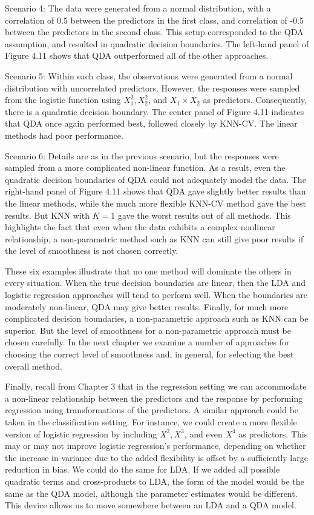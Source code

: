\documentclass[10pt]{article}
\begin{document}
Scenario 4: The data were generated from a normal distribution, with a correlation of 0.5 between the predictors in the first class, and correlation of -0.5 between the predictors in the second class. This setup corresponded to the QDA assumption, and resulted in quadratic decision boundaries. The left-hand panel of Figure 4.11 shows that QDA outperformed all of the other approaches.

Scenario 5: Within each class, the observations were generated from a normal distribution with uncorrelated predictors. However, the responses were sampled from the logistic function using $X_{1}^{2}, X_{2}^{2}$, and $X_{1} \times X_{2}$ as predictors. Consequently, there is a quadratic decision boundary. The center panel of Figure 4.11 indicates that QDA once again performed best, followed closely by KNN-CV. The linear methods had poor performance.

Scenario 6: Details are as in the previous scenario, but the responses were sampled from a more complicated non-linear function. As a result, even the quadratic decision boundaries of QDA could not adequately model the data. The right-hand panel of Figure 4.11 shows that QDA gave slightly better results than the linear methods, while the much more flexible KNN-CV method gave the best results. But KNN with $K=1$ gave the worst results out of all methods. This highlights the fact that even when the data exhibits a complex nonlinear relationship, a non-parametric method such as KNN can still give poor results if the level of smoothness is not chosen correctly.

These six examples illustrate that no one method will dominate the others in every situation. When the true decision boundaries are linear, then the LDA and logistic regression approaches will tend to perform well. When the boundaries are moderately non-linear, QDA may give better results. Finally, for much more complicated decision boundaries, a non-parametric approach such as KNN can be superior. But the level of smoothness for a non-parametric approach must be chosen carefully. In the next chapter we examine a number of approaches for choosing the correct level of smoothness and, in general, for selecting the best overall method.

Finally, recall from Chapter 3 that in the regression setting we can accommodate a non-linear relationship between the predictors and the response by performing regression using transformations of the predictors. A similar approach could be taken in the classification setting. For instance, we could create a more flexible version of logistic regression by including $X^{2}, X^{3}$, and even $X^{4}$ as predictors. This may or may not improve logistic regression's performance, depending on whether the increase in variance due to the added flexibility is offset by a sufficiently large reduction in bias. We could do the same for LDA. If we added all possible quadratic terms and cross-products to LDA, the form of the model would be the same as the QDA model, although the parameter estimates would be different. This device allows us to move somewhere between an LDA and a QDA model.
\end{document}
